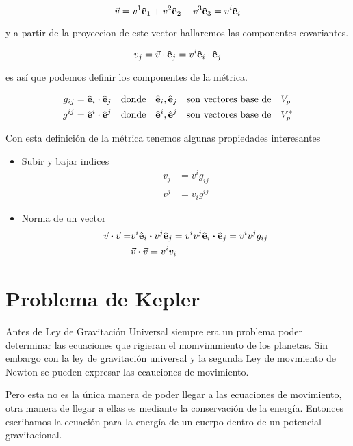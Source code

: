\documentclass[../Main.tex]{subfiles}
\begin{document}
\begin{equation}
    \vec{v}=v^{1}\vu{e}_1+v^{2}\vu{e}_2+v^{3}\vu{e}_3 = v^{i}\vu{e}_i
\end{equation}

y a partir de la proyeccion de este vector hallaremos las componentes covariantes.

\begin{equation}
    v_{j}=\vec{v}\cdot\vu{e}_{j}=v^{i}\vu{e}_i\cdot\vu{e}_{j}
\end{equation}

es así que podemos definir los componentes de la métrica.

\begin{eqnarray}
    g_{ij} = \vu{e}_i\cdot\vu{e}_{j} & \qq{donde} \vu{e}_i,\vu{e}_j \qq{son vectores base de} V_{p}\\
    g^{ij} = \vu{e}^i\cdot\vu{e}^{j} & \qq{donde} \vu{e}^i,\vu{e}^j \qq{son vectores base de} V^{*}_{p}
\end{eqnarray}

Con esta definición de la métrica tenemos algunas propiedades interesantes

\begin{itemize}
    \item Subir y bajar indices
    \begin{eqnarray}
        v_{j} & = v^{i} g_{ij} \\
        v^{j} & = v_{i} g^{ij}
    \end{eqnarray}
    \item Norma de un vector
    \begin{eqnarray}
        \vec{v}\vdot\vec{v}= & v^{i}\vu{e}_i\vdot v^{j}\vu{e}_j=v^{i}v^{j}\vu{e}_i\vdot\vu{e}_{j}=v^{i}v^{j}g_{ij} \\ 
        & \vec{v}\vdot\vec{v} = v^{i} v_{i}
    \end{eqnarray}
\end{itemize}

\section{Problema de Kepler}
Antes de Ley de Gravitación Universal siempre era un problema poder determinar las ecuaciones que rigieran el momvimmiento de los planetas. Sin embargo con la ley de gravitación universal y la segunda Ley de movmiento de Newton se pueden expresar las ecauciones de movimiento.

Pero esta no es la única manera de poder llegar a las ecuaciones de movimiento, otra manera de llegar a ellas es mediante la conservación de la energía. Entonces escribamos la ecuación para la energía de un cuerpo dentro de un potencial gravitacional.
\end{document}
